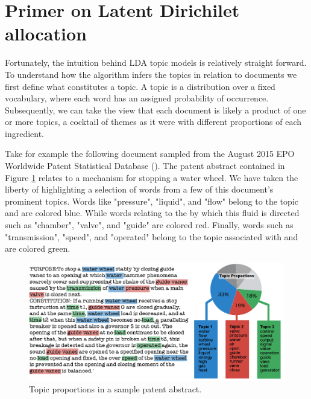 


\section{Primer on Latent Dirichilet allocation}
Fortunately, the intuition behind LDA topic models is relatively straight forward. To understand how the algorithm infers the topics in relation to documents we first define what constitutes a topic. A topic is a distribution over a fixed vocabulary, where each word has an assigned probability of occurrence. Subsequently, we can take the view that each document is likely a product of one or more topics, a cocktail of themes as it were with different proportions of each ingredient.

Take for example the following document sampled from the August 2015 EPO Worldwide Patent Statistical Database (). The patent abstract contained in Figure \ref{fig:Patent_114} relates to a mechanism for stopping a water wheel. We have taken the liberty of highlighting a selection of words from a few of this document's prominent topics. Words like 
"pressure", "liquid", and "flow" belong to the  topic and are colored blue. While words relating to the  by which this fluid is directed such as "chamber", "valve", and "guide" are colored red. Finally, words such as "transmission", "speed", and "operated" belong to the topic associated with  and are colored green.

\begin{figure}[h]
\centering
\includegraphics[width=130mm,scale=0.45]{Figures/Patent114}
\decoRule
\caption[Patent114]{Topic proportions in a sample patent abstract.}
\label{fig:Patent_114}
\end{figure}

